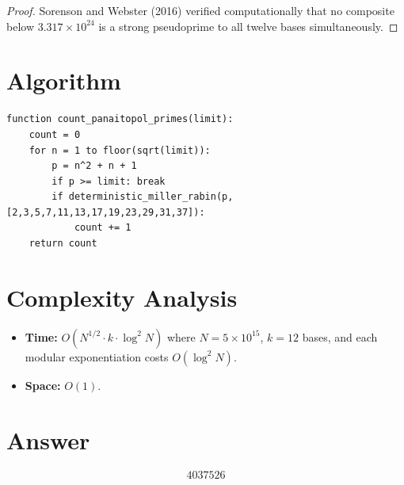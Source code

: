 \documentclass[12pt]{article}
\begin{document}
\begin{proof}
Sorenson and Webster (2016) verified computationally that no composite below $3.317 \times 10^{24}$ is a strong pseudoprime to all twelve bases simultaneously.
\end{proof}

\section{Algorithm}

\begin{verbatim}
function count_panaitopol_primes(limit):
    count = 0
    for n = 1 to floor(sqrt(limit)):
        p = n^2 + n + 1
        if p >= limit: break
        if deterministic_miller_rabin(p, [2,3,5,7,11,13,17,19,23,29,31,37]):
            count += 1
    return count
\end{verbatim}

\section{Complexity Analysis}
\begin{itemize}
\item \textbf{Time:} $O(N^{1/2} \cdot k \cdot \log^2 N)$ where $N = 5 \times 10^{15}$, $k = 12$ bases, and each modular exponentiation costs $O(\log^2 N)$.
\item \textbf{Space:} $O(1)$.
\end{itemize}

\section{Answer}

\[
\boxed{4037526}
\]
\end{document}
